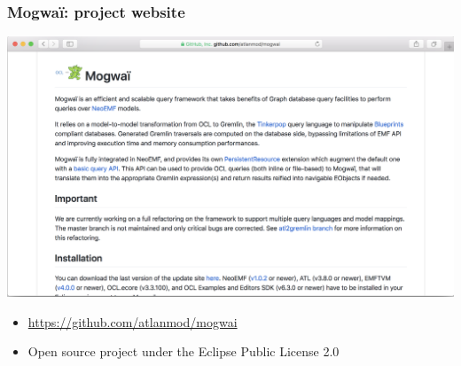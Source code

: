 \documentclass[10pt]{beamer}
\begin{document}
\begin{frame}[c]\frametitle{Mogwa\"i: project website}
  \begin{center}
    \includegraphics[width=\textwidth]{mogwai-github.png}
  \end{center}
	
  \begin{itemize}
  \item \url{https://github.com/atlanmod/mogwai}
  \item Open source project under the Eclipse Public License 2.0
  \end{itemize}
\end{frame}
\end{document}
